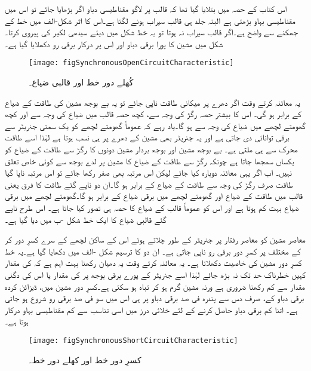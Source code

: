 اس کتاب کے حصہ  میں بتلایا گیا تھا کہ قالب پر لاگو مقناطیسی دباو اگر بڑھایا جائے تو اس میں مقناطیسی بہاو بڑھتی ہے البتہ جلد ہی قالب سیراب ہونے لگتا ہے۔اس کا اثر شکل-الف میں خط کے جھکنے سے واضح ہے۔اگر قالب سیراب نہ ہوتا تو یہ خط شکل میں دیئے سیدھی لکیر کی پیروی کرتا۔شکل میں مشین کا پورا برقی دباو اور اس  پر درکار برقی رو  دکھلایا گیا ہے۔
\begin{figure}
\centering
\texttt{[image: figSynchronousOpenCircuitCharacteristic]}
\caption{کُھلے دور خط اور قالبی ضیاع۔}
\label{شکل_معاصر_کھلے_دور_خط}
\end{figure}

یہ معائنہ کرتے وقت اگر دھرے پر میکانی طاقت  ناپی جائے تو یہ بے بوجھ مشین کی طاقت کے ضیاع کے برابر ہو گی۔ اس کا بیشتر حصہ رگڑ کی وجہ سے، کچھ حصہ قالب میں ضیاع کی وجہ سے اور کچھ گھومتے لچھے میں ضیاع کی وجہ سے ہو گا۔یاد رہے کہ عموماً گھومتے لچھے کو یک سمتی جنریٹر سے برقی توانائی دی جاتی ہے اور یہ جنریٹر بھی مشین کے دھرے پر ہی نسب ہوتا ہے لہٰذا اسے طاقت محرک سے ہی ملتی ہے۔ بے بوجھ مشین اور بوجھ بردار مشین دونوں کا رگڑ سے طاقت کے ضیاع کو یکساں سمجھا جاتا ہے چونکہ رگڑ سے طاقت کے ضیاع کا مشین پر لدے بوجھ سے کوئی خاص تعلق نہیں۔ اب اگر یہی معائنہ دوبارہ کیا جائے لیکن اس مرتبہ  بھی صفر رکھا جائے تو اس مرتبہ ناپا گیا طاقت  صرف رگڑ کی وجہ سے طاقت کے ضیاع کے برابر ہو گا۔ان دو ناپے گئے طاقت کا فرق یعنی  قالب میں طاقت کے ضیاع  اور گھومتے لچھے میں برقی ضیاع کے برابر ہو گا۔گھومتے لچھے میں برقی ضیاع بہت کم ہوتا ہے اور اس کو عموماً قالب کے ضیاع کا حصہ ہی تصور کیا جاتا ہے۔ اس طرح ناپے گئے قالبی ضیاع کا ایک خط شکل  -ب میں دیا گیا ہے۔

معاصر مشین کو معاصر رفتار پر جنریٹر کے طور چلاتے ہوئے اس کے ساکن لچھے کے سرے کسرِ دور کر کے مختلف  پر کسرِ دور برقی رو  ناپی جاتی ہے۔ ان دو کا ترسیم شکل -الف میں دکھایا گیا ہے۔یہ خط کسرِ دور مشین کی خاصیت دکھلاتا ہے۔  یہ معائنہ کرتے وقت یہ دھیان رکھنا بہت اہم ہے کہ  کی مقدار کہیں خطرناک حد تک نہ بڑھ جائے لہٰذا اسے جنریٹر کے پورے برقی بوجھ پر  کی مقدار  یا اس کی دگنی مقدار سے کم رکھنا ضروری ہے ورنہ مشین گرم ہو کر تباہ ہو سکتی ہے۔کسرِ دور مشین میں، ڈیزائن کردہ برقی دباو کے، صرف دس سے پندرہ فی صد برقی دباو پر ہی اس میں سو فی صد برقی رو شروع ہو جاتی ہے۔ اتنا کم برقی دباو حاصل کرنے کے لئے خلائی درز میں اسی تناسب سے  کم مقناطیسی بہاو درکار ہوتا ہے۔ 
\begin{figure}
\centering
\texttt{[image: figSynchronousShortCircuitCharacteristic]}
\caption{کسرِ دور خط اور کھلے دور خط۔}
\label{شکل_معاصر_کسر_دور_اور_کھلے_دور_خط}
\end{figure}

